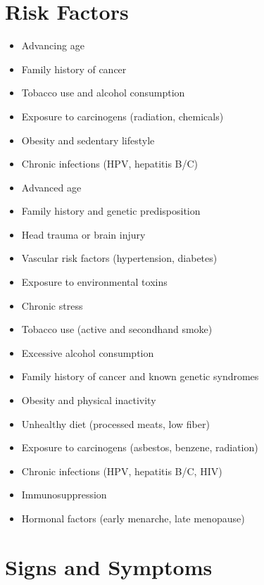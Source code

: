 \section{Risk Factors}

\begin{itemize}[noitemsep]
  \item Advancing age
  \item Family history of cancer
  \item Tobacco use and alcohol consumption
  \item Exposure to carcinogens (radiation, chemicals)
  \item Obesity and sedentary lifestyle
  \item Chronic infections (HPV, hepatitis B/C)
  \item Advanced age
  \item Family history and genetic predisposition
  \item Head trauma or brain injury
  \item Vascular risk factors (hypertension, diabetes)
  \item Exposure to environmental toxins
  \item Chronic stress
  \item Tobacco use (active and secondhand smoke)
  \item Excessive alcohol consumption
  \item Family history of cancer and known genetic syndromes
  \item Obesity and physical inactivity
  \item Unhealthy diet (processed meats, low fiber)
  \item Exposure to carcinogens (asbestos, benzene, radiation)
  \item Chronic infections (HPV, hepatitis B/C, HIV)
  \item Immunosuppression
  \item Hormonal factors (early menarche, late menopause)
\end{itemize}
\section{Signs and Symptoms}

